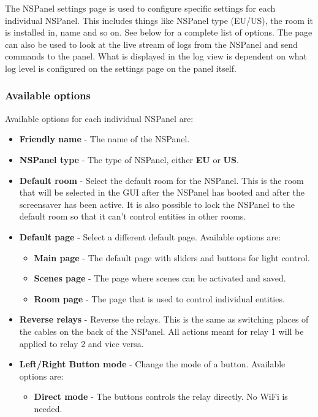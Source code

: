 \documentclass[10pt]{article}
\begin{document}
    The NSPanel settings page is used to configure specific settings for each individual NSPanel. This includes things like NSPanel type (EU/US), the room it is installed in, name and so on. See below for a complete list of options.
    The page can also be used to look at the live stream of logs from the NSPanel and send commands to the panel. What is displayed in the log view is dependent on what log level is configured on the settings page on the panel itself.
    \subsubsection{Available options}
    Available options for each individual NSPanel are:

    \begin{itemize}
      \item \textbf{Friendly name} - The name of the NSPanel.
      \item \textbf{NSPanel type} - The type of NSPanel, either \textbf{EU} or \textbf{US}.
      \item \textbf{Default room} - Select the default room for the NSPanel. This is the room that will be selected in the GUI after the NSPanel has booted and after the screensaver has been active. It is also possible to lock the NSPanel to the default room so that it can't control entities in other rooms.
      \item \textbf{Default page} - Select a different default page. Available options are:
      \begin{itemize}
        \item \textbf{Main page} - The default page with sliders and buttons for light control.
        \item \textbf{Scenes page} - The page where scenes can be activated and saved.
        \item \textbf{Room page} - The page that is used to control individual entities.
      \end{itemize}
      \item \textbf{Reverse relays} - Reverse the relays. This is the same as switching places of the cables on the back of the NSPanel. All actions meant for relay 1 will be applied to relay 2 and vice versa.
      \item \textbf{Left/Right Button mode} - Change the mode of a button. Available options are:
      \begin{itemize}
        \item \textbf{Direct mode} - The buttons controls the relay directly. No WiFi is needed.

\end{itemize}
\end{itemize}
\end{document}
